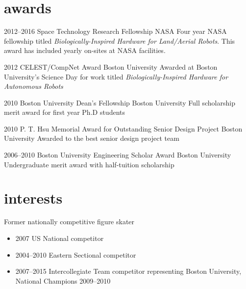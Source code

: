 \documentclass[print]{friggeri-cv} %
\begin{document}
\clearpage
{}

\section{awards}

\begin{entrylist}


\entry
{2012--2016}
{Space Technology Research Fellowship}
{NASA}
{Four year NASA fellowship titled \emph{Biologically-Inspired Hardware for Land/Aerial Robots}. This award has included yearly on-sites at NASA facilities.}

\entry
{2012}
{CELEST/CompNet Award}
{Boston University}
{Awarded at Boston University's Science Day for work titled \emph{Biologically-Inspired Hardware for Autonomous Robots}}

\entry
{2010}
{Boston University Dean's Fellowship}
{Boston University}
{Full scholarship merit award for first year Ph.D students}

\entry
{2010}
{P. T. Hsu Memorial Award for Outstanding Senior Design Project}
{Boston University}
{Awarded to the best senior design project team}

\entry
{2006--2010}
{Boston University Engineering Scholar Award}
{Boston University}
{Undergraduate merit award with half-tuition scholarship}


\end{entrylist}



\section{interests}
Former nationally competitive figure skater
\begin{itemize}
\item 2007 US National competitor
\item 2004--2010 Eastern Sectional competitor
\item 2007--2015 Intercollegiate Team competitor representing Boston University, National Champions 2009--2010
\end{itemize}
\end{document}
